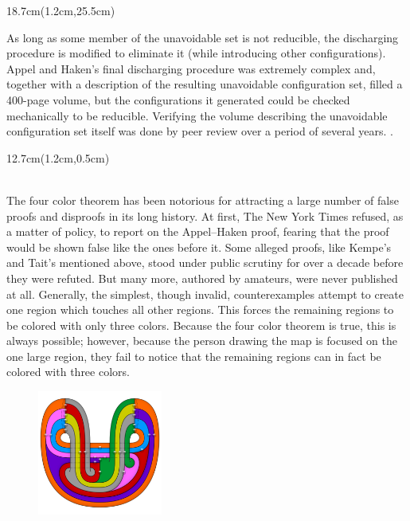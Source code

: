 \documentclass[11pt,a4paper,twoside]{book}
\newenvironment{positionedparagraph}[4]{%
	\begin{textblock*}{#1}(#2,#3)
		\noindent\textbf{#4}\par\medskip
	}{%
	\end{textblock*}
}
\begin{document}
\begin{positionedparagraph}{18.7cm}{1.2cm}{25.5cm}
	\
	As long as some member of the unavoidable set is not reducible, the discharging procedure is modified to eliminate it (while introducing other configurations). Appel and Haken's final discharging procedure was extremely complex and, together with a description of the resulting unavoidable configuration set, filled a 400-page volume, but the configurations it generated could be checked mechanically to be reducible. Verifying the volume describing the unavoidable configuration set itself was done by peer review over a period of several years. .  
\end{positionedparagraph}

\newpage
\begin{positionedparagraph}{12.7cm}{1.2cm}{0.5cm}
	\\
	 \\[0.2cm]
	The four color theorem has been notorious for attracting a large number of false proofs and disproofs in its long history. At first, The New York Times refused, as a matter of policy, to report on the Appel–Haken proof, fearing that the proof would be shown false like the ones before it. Some alleged proofs, like Kempe's and Tait's mentioned above, stood under public scrutiny for over a decade before they were refuted. But many more, authored by amateurs, were never published at all. Generally, the simplest, though invalid, counterexamples attempt to create one region which touches all other regions. This forces the remaining regions to be colored with only three colors. Because the four color theorem is true, this is always possible; however, because the person drawing the map is focused on the one large region, they fail to notice that the remaining regions can in fact be colored with three colors. 
\end{positionedparagraph}
\begin{figure}[htbp]
	\vspace{2cm}
	\hspace{15cm}
	\begin{minipage}{0.45\textwidth}
		\includegraphics[width=4.1cm]{myimages/pic7.png}
	\end{minipage}
\end{figure}
\end{document}
